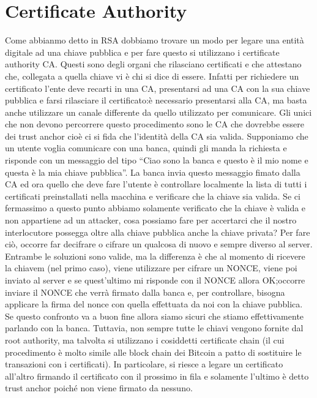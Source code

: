 \documentclass{article}
\begin{document}
\section{Certificate Authority}
Come abbianmo detto in RSA dobbiamo trovare un modo per legare una entità digitale ad una chiave pubblica e per fare questo si utilizzano i certificate authority CA\@. Questi sono degli organi che rilasciano certificati e che attestano che, collegata a quella chiave vi è chi si dice di essere\@.\newline
Infatti per richiedere un certificato l'ente deve recarti in una CA, presentarsi ad una CA con la sua chiave pubblica e farsi rilasciare il certificato:\@non è necessario presentarsi alla CA, ma basta anche utilizzare un canale differente da quello utilizzato per comunicare\@.
Gli unici che non devono percorrere questo procedimento sono le CA che dovrebbe essere dei trust anchor cioè ci si fida che l'identità della CA sia valida\@.\newline
Supponiamo che un utente voglia comunicare con una banca, quindi gli manda la richiesta e risponde con un messaggio del tipo ``Ciao sono la banca e questo è il mio nome e questa è la mia chiave pubblica''\@. La banca invia questo messaggio fimato dalla CA ed ora quello che deve fare l'utente è controllare localmente la lista di tutti i certificati preinstallati nella macchina e verificare che la chiave sia valida\@.\newline
Se ci fermassimo a questo punto abbiamo solamente verificato che la chiave è valida e non appartiene ad un attacker, cosa possiamo fare per accertarci che il nostro interlocutore possegga oltre alla chiave pubblica anche la chiave privata?\@
Per fare ciò, occorre far decifrare o cifrare un qualcosa di nuovo e sempre diverso al server\@. Entrambe le soluzioni sono valide, ma la differenza è che al momento di ricevere la chiavem (nel primo caso), viene utilizzare per cifrare un NONCE, viene poi inviato al server e se quest'ultimo mi risponde con il NONCE allora OK;\@altrimenti occorre inviare il NONCE che verrà firmato dalla banca e, per controllare, bisogna applicare la firma del nonce con quella effettuata da noi con la chiave pubblica\@. Se questo confronto va a buon fine allora siamo sicuri che stiamo effettivamente parlando con la banca\@.\newline
Tuttavia, non sempre tutte le chiavi vengono fornite dal root authority, ma talvolta si utilizzano i cosiddetti certificate chain (il cui procedimento è molto simile alle block chain dei Bitcoin a patto di sostituire le transazioni con i certificati)\@. In particolare, si riesce a legare un certificato all'altro firmando il certificato con il prossimo in fila e solamente l'ultimo è detto trust anchor poiché non viene firmato da nessuno\@.
\end{document}

